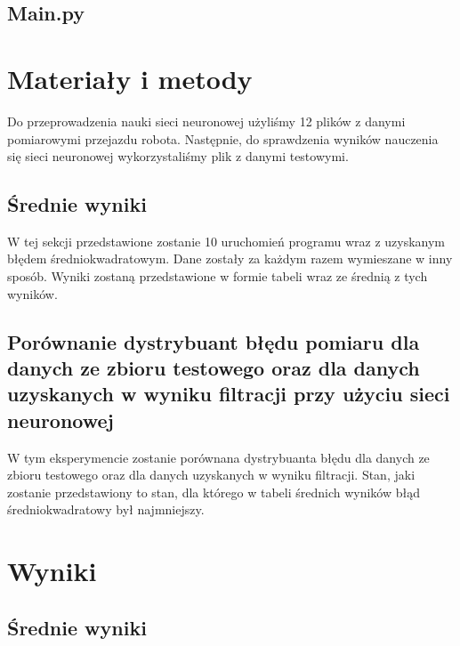 \documentclass{classrep}
\begin{document}


\subsection{Main.py}




\section{Materiały i metody}
Do przeprowadzenia nauki sieci neuronowej użyliśmy 12 plików z danymi pomiarowymi przejazdu robota. Następnie, do sprawdzenia wyników nauczenia się sieci neuronowej wykorzystaliśmy plik z danymi testowymi. \cite{pliki}

\subsection{Średnie wyniki}
W tej sekcji przedstawione zostanie 10 uruchomień programu wraz z uzyskanym błędem średniokwadratowym. Dane zostały za każdym razem wymieszane w inny sposób. Wyniki zostaną przedstawione w formie tabeli wraz ze średnią z tych wyników.

\subsection{Porównanie dystrybuant błędu pomiaru dla danych ze zbioru testowego oraz dla danych uzyskanych w wyniku filtracji przy użyciu sieci neuronowej}
W tym eksperymencie zostanie porównana dystrybuanta błędu dla danych ze zbioru testowego oraz dla danych uzyskanych w wyniku filtracji. Stan, jaki zostanie przedstawiony to stan, dla którego w tabeli średnich wyników błąd średniokwadratowy był najmniejszy.


\section{Wyniki}

\subsection{Średnie wyniki}
\end{document}
